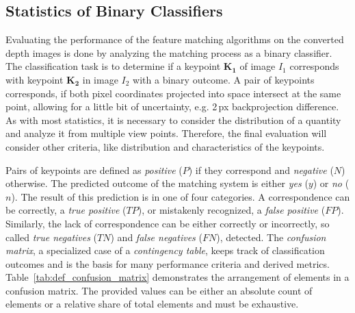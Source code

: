 \subsection{Statistics of Binary Classifiers}\label{sec:statistic_classifier}

Evaluating the performance of the feature matching algorithms on the converted depth images is done by analyzing the matching process as a binary classifier.
The classification task is to determine if a keypoint $\mathbf{K_1}$ of image $I_1$ corresponds with keypoint $\mathbf{K_2}$ in image $I_2$ with a binary outcome.
A pair of keypoints corresponds, if both pixel coordinates projected into space intersect at the same point, allowing for a little bit of uncertainty, e.g. 2\,px backprojection difference.
As with most statistics, it is necessary to consider the distribution of a quantity and analyze it from multiple view points.
Therefore, the final evaluation will consider other criteria, like distribution and characteristics of the keypoints.

Pairs of keypoints are defined as \emph{positive} ($P$) if they correspond and \emph{negative} ($N$) otherwise.
The predicted outcome of the matching system is either \emph{yes} ($y$) or \emph{no} ($n$).
The result of this prediction is in one of four categories.
A correspondence can be correctly, a \emph{true positive} ($TP$), or mistakenly recognized, a \emph{false positive} ($FP$).
Similarly, the lack of correspondence can be either correctly or incorrectly, so called \emph{true negatives} ($TN$) and \emph{false negatives} ($FN$), detected.
The \emph{confusion matrix}, a specialized case of a \emph{contingency table}\cite{agresti_2007}, keeps track of classification outcomes and is the basis for many performance criteria and derived metrics.
Table~\ref{tab:def_confusion_matrix} demonstrates the arrangement of elements in a confusion matrix.
The provided values can be either an absolute count of elements or a relative share of total elements and must be exhaustive.

